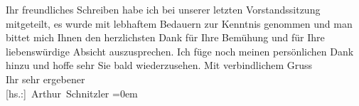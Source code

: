 \begin{ledgroupsized}[t]{13cm}
           Ihr freundliches Schreiben habe ich bei unserer letzten Vorstandssitzung mitgeteilt, es wurde mit
               lebhaftem Bedauern zur Kenntnis genommen und man bittet mich Ihnen den herzlichsten
               Dank für Ihre Bemühung und für Ihre liebenswürdige Absicht auszusprechen.\pend
           \pstart
           Ich füge noch meinen persönlichen Dank hinzu und hoffe sehr Sie bald
               wiederzusehen.\pend
           \pstart
           Mit verbindlichem Gruss{\\[\baselineskip]}Ihr sehr ergebener{\\[\baselineskip]}\spacefill\mbox{{[}hs.:{]} Arthur Schnitzler}\pend
           \leftskip=0em{}
         
         \endnumbering{}\end{ledgroupsized}  \newcommand{\dateiname}{L02358}\newcommand{\titel}{Arthur Schnitzler an Robert Adam, 20. 11. 1920}\newcommand{\editorInnen}{Martin Anton Müller und Gerd-Hermann Susen}
      
